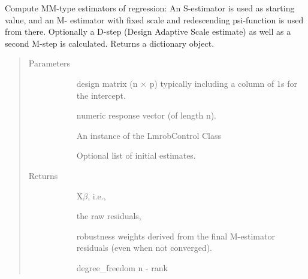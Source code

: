 \documentclass[letterpaper,10pt,english]{sphinxmanual}
\begin{document}

\begin{fulllineitems}
\label{\detokenize{_modules/lmrob:lmrob.lmrob_fit}}
Compute MM-type estimators of regression: An S-estimator is used as starting value, and an M-
estimator with fixed scale and redescending psi-function is used from there. Optionally a D-step
(Design Adaptive Scale estimate) as well as a second M-step is calculated. Returns a dictionary
object.
\begin{quote}\begin{description}
\item[{Parameters}] \leavevmode\begin{description}
\item[{}] \leavevmode
design matrix (n × p) typically including a column of 1s for the intercept.

\item[{}] \leavevmode
numeric response vector (of length n).

\item[{}] \leavevmode
An instance of the LmrobControl Class

\item[{}] \leavevmode
Optional list of initial estimates. 

\end{description}

\item[{Returns}] \leavevmode\begin{description}
\item[{}] \leavevmode
X\(\beta\), i.e., 

\item[{}] \leavevmode
the raw residuals, 

\item[{}] \leavevmode
robustness weights derived from the final M-estimator residuals (even when not
converged).

\item[{}] \leavevmode
degree\_freedom n - rank


\end{description}
\end{description}
\end{quote}
\end{fulllineitems}
\end{document}
